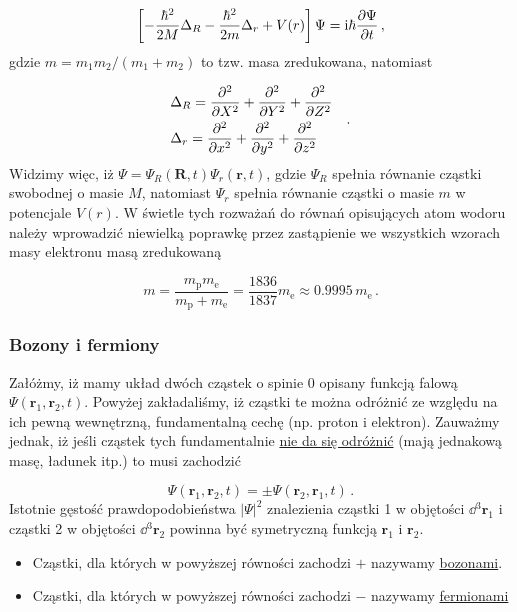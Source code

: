 \documentclass{myclass}
\begin{document}
\begin{itemize}
\begin{equation*}
    \left[-\frac{\hbar^2}{2M}\Delta_R-\frac{\hbar^2}{2m}\Delta_r+V(r)\right]\Psi=\mathrm{i}\hbar\pdv{\Psi}{t}\,,
\end{equation*}
gdzie \(m=m_1m_2/(m_1+m_2)\) to tzw. masa zredukowana, natomiast

\begin{equation*}
    \begin{split}
        &\Delta_R=\pdv[2]{ }{X}+\pdv[2]{ }{Y}+\pdv[2]{ }{Z}\\
        &\Delta_r=\pdv[2]{ }{x}+\pdv[2]{ }{y}+\pdv[2]{ }{z}
    \end{split}\quad.
\end{equation*}
Widzimy więc, iż \(\Psi=\Psi_R(\mathbf{R},t)\Psi_r(\mathbf{r},t)\), gdzie \(\Psi_R\) spełnia
równanie cząstki swobodnej o masie \(M\), natomiast \(\Psi_r\) spełnia równanie cząstki o masie
\(m\) w potencjale \(V(r)\). W świetle tych rozważań do równań opisujących atom wodoru należy
wprowadzić niewielką poprawkę przez zastąpienie we wszystkich wzorach masy elektronu masą
zredukowaną

\begin{equation*}
    m=\frac{m_\text{p}m_\text{e}}{m_\text{p}+m_\text{e}}=\frac{1836}{1837}m_\text{e}\approx 0.9995\,m_\text{e}\,.
\end{equation*}
\end{itemize}

\subsubsection{Bozony i fermiony}

Załóżmy, iż mamy układ dwóch cząstek o spinie 0 opisany funkcją falową
\(\Psi(\mathbf{r}_1,\mathbf{r}_2,t)\). Powyżej zakładaliśmy, iż cząstki te można odróżnić ze względu
na ich pewną wewnętrzną, fundamentalną cechę (np. proton i elektron). Zauważmy jednak, iż jeśli
cząstek tych fundamentalnie \underline{nie da się odróżnić} (mają jednakową masę, ładunek itp.) to
musi zachodzić 

\begin{equation*}
\boxed{\Psi(\mathbf{r}_1,\mathbf{r}_2,t)=\pm\Psi(\mathbf{r}_2,\mathbf{r}_1,t)}\,.
\end{equation*}
Istotnie gęstość prawdopodobieństwa \(|\Psi|^2\) znalezienia cząstki 1 w objętości
\(\dd{^3\mathbf{r}_1}\) i cząstki 2 w objętości \(\dd{^3\mathbf{r}_2}\) powinna być symetryczną
funkcją \(\mathbf{r}_1\) i \(\mathbf{r}_2\).

\begin{itemize}

\item Cząstki, dla których w powyższej równości zachodzi \(+\) nazywamy \underline{bozonami}.

\item Cząstki, dla których w powyższej równości zachodzi \(-\) nazywamy
\underline{fermionami}
\end{itemize}
\end{document}
